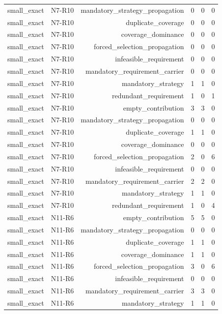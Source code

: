 {\begin{longtable}{lrrrrr}
small\_exact & N7-R10 & mandatory\_strategy\_propagation & 0 & 0 & 0 \\
small\_exact & N7-R10 & duplicate\_coverage & 0 & 0 & 0 \\
small\_exact & N7-R10 & coverage\_dominance & 0 & 0 & 0 \\
small\_exact & N7-R10 & forced\_selection\_propagation & 0 & 0 & 0 \\
small\_exact & N7-R10 & infeasible\_requirement & 0 & 0 & 0 \\
small\_exact & N7-R10 & mandatory\_requirement\_carrier & 0 & 0 & 0 \\
small\_exact & N7-R10 & mandatory\_strategy & 1 & 1 & 0 \\
small\_exact & N7-R10 & redundant\_requirement & 1 & 0 & 1 \\
small\_exact & N7-R10 & empty\_contribution & 3 & 3 & 0 \\
small\_exact & N7-R10 & mandatory\_strategy\_propagation & 0 & 0 & 0 \\
small\_exact & N7-R10 & duplicate\_coverage & 1 & 1 & 0 \\
small\_exact & N7-R10 & coverage\_dominance & 0 & 0 & 0 \\
small\_exact & N7-R10 & forced\_selection\_propagation & 2 & 0 & 6 \\
small\_exact & N7-R10 & infeasible\_requirement & 0 & 0 & 0 \\
small\_exact & N7-R10 & mandatory\_requirement\_carrier & 2 & 2 & 0 \\
small\_exact & N7-R10 & mandatory\_strategy & 1 & 1 & 0 \\
small\_exact & N7-R10 & redundant\_requirement & 1 & 0 & 4 \\
small\_exact & N11-R6 & empty\_contribution & 5 & 5 & 0 \\
small\_exact & N11-R6 & mandatory\_strategy\_propagation & 0 & 0 & 0 \\
small\_exact & N11-R6 & duplicate\_coverage & 1 & 1 & 0 \\
small\_exact & N11-R6 & coverage\_dominance & 1 & 1 & 0 \\
small\_exact & N11-R6 & forced\_selection\_propagation & 3 & 0 & 6 \\
small\_exact & N11-R6 & infeasible\_requirement & 0 & 0 & 0 \\
small\_exact & N11-R6 & mandatory\_requirement\_carrier & 3 & 3 & 0 \\
small\_exact & N11-R6 & mandatory\_strategy & 1 & 1 & 0 \\

\end{longtable}}
